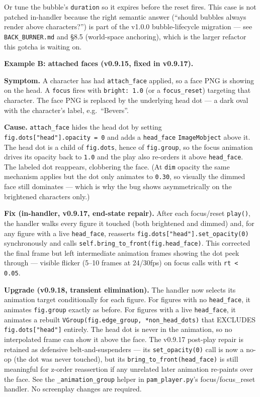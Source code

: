 \documentclass[
  12pt,
  letterpaper,
]{book}
\begin{document}
Or tune the bubble's \texttt{duration} so it expires before the reset
fires. This case is not patched in-handler because the right semantic
answer (``should bubbles always render above characters?'') is part of
the v1.0.0 bubble-lifecycle migration --- see
\texttt{BACK\_BURNER.md} and \S 8.5 (world-space anchoring), which is
the larger refactor this gotcha is waiting on.

\medskip

\textbf{Example B: attached faces (v0.9.15, fixed in v0.9.17).}

\textbf{Symptom.} A character has had \texttt{attach\_face} applied,
so a face PNG is showing on the head. A \texttt{focus} fires with
\texttt{bright:\ 1.0} (or a \texttt{focus\_reset}) targeting that
character. The face PNG is replaced by the underlying head dot --- a
dark oval with the character's label, e.g.\ ``Bevers''.

\textbf{Cause.} \texttt{attach\_face} hides the head dot by setting
\texttt{fig.dots["head"].opacity\ =\ 0} and adds a \texttt{head\_face}
\texttt{ImageMobject} above it. The head dot is a child of
\texttt{fig.dots}, hence of \texttt{fig.group}, so the focus
animation drives its opacity back to \texttt{1.0} and the play also
re-orders it above \texttt{head\_face}. The labeled dot reappears,
clobbering the face. (At \texttt{dim} opacity the same mechanism
applies but the dot only animates to \texttt{0.30}, so visually the
dimmed face still dominates --- which is why the bug shows
asymmetrically on the brightened characters only.)

\textbf{Fix (in-handler, v0.9.17, end-state repair).} After each
focus/reset \texttt{play()}, the handler walks every figure it touched
(both brightened and dimmed) and, for any figure with a live
\texttt{head\_face}, reasserts
\texttt{fig.dots["head"].set\_opacity(0)} synchronously and calls
\texttt{self.bring\_to\_front(fig.head\_face)}. This corrected the
final frame but left intermediate animation frames showing the dot
peek through --- visible flicker (5--10 frames at 24/30fps) on focus
calls with \texttt{rt < 0.05}.

\textbf{Upgrade (v0.9.18, transient elimination).} The handler now
selects its animation target conditionally for each figure. For
figures with no \texttt{head\_face}, it animates \texttt{fig.group}
exactly as before. For figures with a live \texttt{head\_face}, it
animates a rebuilt \texttt{VGroup(fig.edge\_group,\ *non\_head\_dots)}
that EXCLUDES \texttt{fig.dots["head"]} entirely. The head dot is
never in the animation, so no interpolated frame can show it above
the face. The v0.9.17 post-play repair is retained as defensive
belt-and-suspenders --- its \texttt{set\_opacity(0)} call is now a
no-op (the dot was never touched), but its
\texttt{bring\_to\_front(head\_face)} is still meaningful for z-order
reassertion if any unrelated later animation re-paints over the face.
See the \texttt{\_animation\_group} helper in
\texttt{pam\_player.py}'s focus/focus\_reset handler. No screenplay
changes are required.
\end{document}
